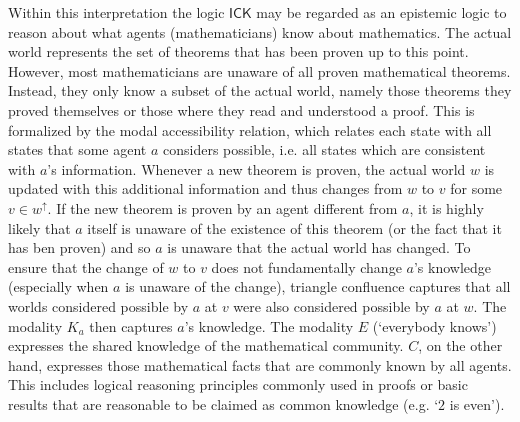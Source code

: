 \documentclass{myifcolog}
\newcommand\C {C}
\newcommand{\agi}{a}
\newcommand{\E}{E}
\newcommand{\ICK}{\mathsf{ICK}}
\numberwithin{theorem}{section}
\begin{document}
Within this interpretation the logic $\ICK$ may be regarded as an epistemic logic to reason about what agents (mathematicians) know about mathematics. The actual world represents the set of theorems that has been proven up to this point. However, most mathematicians are unaware of all proven mathematical theorems. Instead, they only know a subset of the actual world, namely those theorems they proved themselves or those where they read and understood a proof. This is formalized by the modal accessibility relation, which relates each state with all states that some agent $\agi$ considers possible, i.e. all states which are consistent with $\agi$'s information.  Whenever a new theorem is proven, the actual world $w$ is updated with this additional information and thus changes from $w$ to $v$ for some $v \in w^\uparrow$. If the new theorem is proven by an agent different from $\agi$, it is highly likely that $\agi$ itself is unaware of the existence of this theorem (or the fact that it has ben proven) and so $\agi$ is unaware that the actual world has changed. To ensure that the change of $w$ to $v$ does not fundamentally change $\agi$'s knowledge (especially when $\agi$ is unaware of the change), triangle confluence captures that all worlds considered possible by $\agi$ at $v$ were also considered possible by $\agi$ at $w$. The modality $K_\agi$ then captures $\agi$'s knowledge. The modality $\E$ (`everybody knows') expresses the shared knowledge of the mathematical community. $\C$, on the other hand, expresses those mathematical facts that are commonly known by all agents. This includes logical reasoning principles commonly used in proofs or basic results that are reasonable to be claimed as common knowledge (e.g. `$2$ is even').
\end{document}
